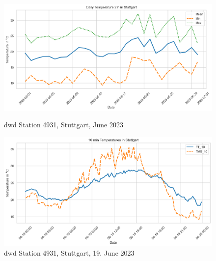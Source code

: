 \begin{figure}[ht]
    \centering
    \includegraphics[width=1\textwidth]{images/dwd_stuttgart_june_23_tair_max_mean_min.png}
    \caption{\gls{dwd} Station 4931, Stuttgart, June 2023}
    \label{fig:dwd stuttgart june 23 mean min max}

    \includegraphics[width=1\textwidth]{images/dwd_stuttgart_june_19_23_tair.png}
    \caption{\gls{dwd} Station 4931, Stuttgart, 19. June 2023}
    \label{fig:dwd stuttgart june 23 10 min 2m 5cm}
\end{figure}
